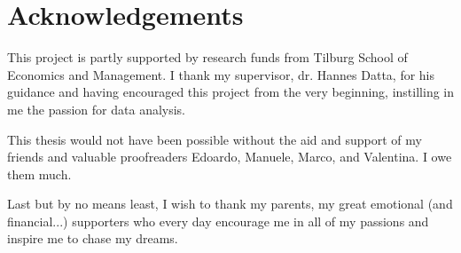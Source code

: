 \documentclass[a4paper,12pt]{article}
\begin{document}
\newpage
\pagestyle{fancy} %
\lhead{\nouppercase{\rightmark}}
\rhead{}







\newpage
\thispagestyle{plain} %
\section*{Acknowledgements}
This project is partly supported by research funds from Tilburg School of Economics and Management. I thank my supervisor, dr. Hannes Datta, for his guidance and having encouraged this project from the very beginning, instilling in me the passion for data analysis.

This thesis would not have been possible without the aid and support of my friends and valuable proofreaders Edoardo, Manuele, Marco, and Valentina. I owe them much.

Last but by no means least, I wish to thank my parents, my great emotional (and financial...) supporters who every day encourage me in all of my passions and inspire me to chase my dreams.

\newpage
\thispagestyle{SectionFirstPage} %
\rhead{}
\renewcommand\refname{Bibliography}


\appendix
\renewcommand\thefigure{\thesection.\arabic{figure}}
\renewcommand\thetable{\thesection.\arabic{table}} %
\lhead{\nouppercase{\rightmark}} %
\rhead{}


\end{document}
